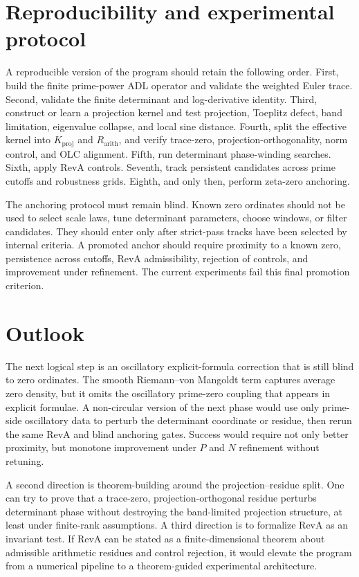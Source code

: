 \documentclass[11pt]{article}
\newcommand{\Rarith}{R_{\mathrm{arith}}}
\newcommand{\Kproj}{K_{\mathrm{proj}}}
\theoremstyle{definition}
\theoremstyle{plain}
\begin{document}
\section{Reproducibility and experimental protocol}

A reproducible version of the program should retain the following order.  First, build the finite prime-power ADL operator and validate the weighted Euler trace.  Second, validate the finite determinant and log-derivative identity.  Third, construct or learn a projection kernel and test projection, Toeplitz defect, band limitation, eigenvalue collapse, and local sine distance.  Fourth, split the effective kernel into $\Kproj$ and $\Rarith$, and verify trace-zero, projection-orthogonality, norm control, and OLC alignment.  Fifth, run determinant phase-winding searches.  Sixth, apply RevA controls.  Seventh, track persistent candidates across prime cutoffs and robustness grids.  Eighth, and only then, perform zeta-zero anchoring.

The anchoring protocol must remain blind.  Known zero ordinates should not be used to select scale laws, tune determinant parameters, choose windows, or filter candidates.  They should enter only after strict-pass tracks have been selected by internal criteria.  A promoted anchor should require proximity to a known zero, persistence across cutoffs, RevA admissibility, rejection of controls, and improvement under refinement.  The current experiments fail this final promotion criterion.

\section{Outlook}

The next logical step is an oscillatory explicit-formula correction that is still blind to zero ordinates.  The smooth Riemann--von Mangoldt term captures average zero density, but it omits the oscillatory prime-zero coupling that appears in explicit formulae.  A non-circular version of the next phase would use only prime-side oscillatory data to perturb the determinant coordinate or residue, then rerun the same RevA and blind anchoring gates.  Success would require not only better proximity, but monotone improvement under $P$ and $N$ refinement without retuning.

A second direction is theorem-building around the projection--residue split.  One can try to prove that a trace-zero, projection-orthogonal residue perturbs determinant phase without destroying the band-limited projection structure, at least under finite-rank assumptions.  A third direction is to formalize RevA as an invariant test.  If RevA can be stated as a finite-dimensional theorem about admissible arithmetic residues and control rejection, it would elevate the program from a numerical pipeline to a theorem-guided experimental architecture.
\end{document}
